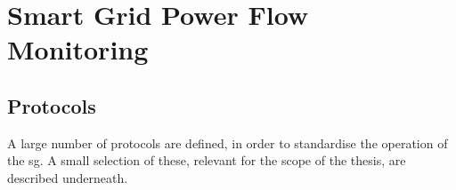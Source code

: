 \chapter{Smart Grid Power Flow Monitoring}






 




\section{Protocols}
A large number of protocols are defined, in order to standardise the operation of the \acrlong{sg}.
A small selection of these, relevant for the scope of the thesis, are described underneath.


